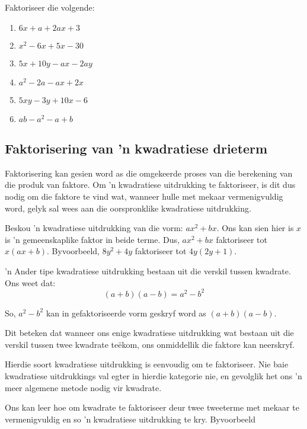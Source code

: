 \begin{exercises}{}{
\nopagebreak
Faktoriseer die volgende:
\begin{multicols}{2}
\begin{enumerate}[itemsep=5pt, label=\textbf{\arabic*}. ] 
\item $6x+a+2ax+3$
\item ${x}^{2}-6x+5x-30$
\item $5x+10y-ax-2ay$
\item ${a}^{2}-2a-ax+2x$
\item $5xy-3y+10x-6$
\item $ab - a^{2} - a + b$
\end{enumerate}
\end{multicols}

}
\end{exercises}

\subsection* {Faktorisering van 'n kwadratiese drieterm}

    
Faktorisering kan gesien word as die omgekeerde proses van die berekening van die produk van faktore. Om ’n kwadratiese uitdrukking te faktoriseer, is dit dus nodig om die faktore te vind wat, wanneer hulle met mekaar vermenigvuldig word, gelyk sal wees aan die oorspronklike kwadratiese uitdrukking.\par 

Beskou ’n kwadratiese uitdrukking van die vorm: $a{x}^{2}+bx$. Ons kan sien hier is  $x$ is ’n gemeenskaplike faktor in beide terme. Dus, $a{x}^{2}+bx$  faktoriseer tot $x(ax+b)$. Byvoorbeeld, $8{y}^{2}+4y$ faktoriseer tot  $4y(2y+1)$.\par 
’n Ander tipe kwadratiese uitdrukking bestaan uit die verskil tussen kwadrate. Ons weet dat:
\begin{equation*}
(a+b)(a-b)={a}^{2}-{b}^{2}
\end{equation*}

So, $a^2-b^2$ kan in gefaktoriseerde vorm geskryf word as $(a+b)(a-b)$. \par

Dit beteken dat wanneer ons enige kwadratiese uitdrukking wat bestaan uit die verskil tussen twee kwadrate te\"ekom, ons onmiddellik die faktore kan neerskryf.


Hierdie soort kwadratiese uitdrukking is eenvoudig om te faktoriseer. Nie baie kwadratiese uitdrukkings val egter
in hierdie kategorie nie, en gevolglik het ons ’n meer algemene metode nodig vir kwadrate.
\par 
Ons kan leer hoe om kwadrate te faktoriseer deur twee tweeterme met mekaar te vermenigvuldig en so ’n kwadratiese uitdrukking te kry. Byvoorbeeld

